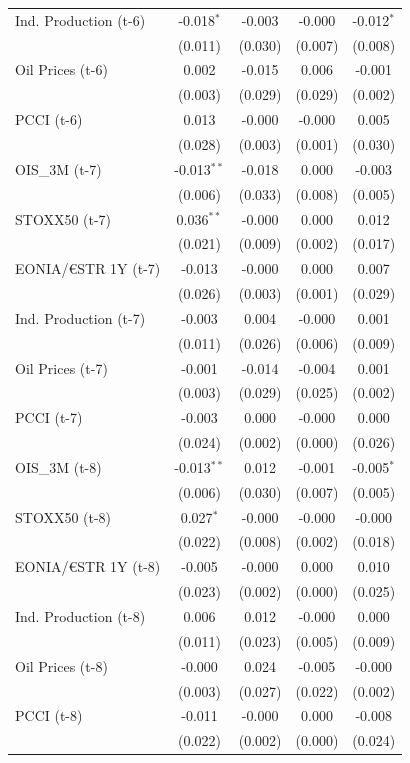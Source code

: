 \begin{longtable}[t]{lcccc}
Ind. Production (t-6) & -0.018$^{*}$ & -0.003 & -0.000 & -0.012$^{*}$\\
 & (0.011) & (0.030) & (0.007) & (0.008)\\
Oil Prices (t-6) & 0.002 & -0.015 & 0.006 & -0.001\\
 & (0.003) & (0.029) & (0.029) & (0.002)\\
PCCI (t-6) & 0.013 & -0.000 & -0.000 & 0.005\\
 & (0.028) & (0.003) & (0.001) & (0.030)\\
OIS\_3M (t-7) & -0.013$^{**}$ & -0.018 & 0.000 & -0.003\\
 & (0.006) & (0.033) & (0.008) & (0.005)\\
STOXX50 (t-7) & 0.036$^{**}$ & -0.000 & 0.000 & 0.012\\
 & (0.021) & (0.009) & (0.002) & (0.017)\\
EONIA/€STR 1Y (t-7) & -0.013 & -0.000 & 0.000 & 0.007\\
 & (0.026) & (0.003) & (0.001) & (0.029)\\
Ind. Production (t-7) & -0.003 & 0.004 & -0.000 & 0.001\\
 & (0.011) & (0.026) & (0.006) & (0.009)\\
Oil Prices (t-7) & -0.001 & -0.014 & -0.004 & 0.001\\
 & (0.003) & (0.029) & (0.025) & (0.002)\\
PCCI (t-7) & -0.003 & 0.000 & -0.000 & 0.000\\
 & (0.024) & (0.002) & (0.000) & (0.026)\\
OIS\_3M (t-8) & -0.013$^{**}$ & 0.012 & -0.001 & -0.005$^{*}$\\
 & (0.006) & (0.030) & (0.007) & (0.005)\\
STOXX50 (t-8) & 0.027$^{*}$ & -0.000 & -0.000 & -0.000\\
 & (0.022) & (0.008) & (0.002) & (0.018)\\
EONIA/€STR 1Y (t-8) & -0.005 & -0.000 & 0.000 & 0.010\\
 & (0.023) & (0.002) & (0.000) & (0.025)\\
Ind. Production (t-8) & 0.006 & 0.012 & -0.000 & 0.000\\
 & (0.011) & (0.023) & (0.005) & (0.009)\\
Oil Prices (t-8) & -0.000 & 0.024 & -0.005 & -0.000\\
 & (0.003) & (0.027) & (0.022) & (0.002)\\
PCCI (t-8) & -0.011 & -0.000 & 0.000 & -0.008\\
 & (0.022) & (0.002) & (0.000) & (0.024)\\

\end{longtable}
